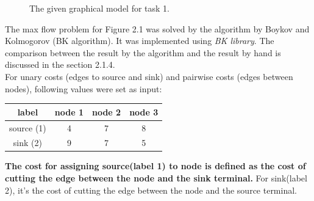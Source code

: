 \documentclass[paper=a4, fontsize=11pt]{scrartcl} %
\numberwithin{equation}{section} %
\numberwithin{figure}{section} %
\numberwithin{table}{section} %
\begin{document}
\begin{figure}[H]
\caption{The given graphical model for task 1.\label{fig:simple}}
\vspace*{5mm}
\centering
{}
\end{figure}

The max flow problem for Figure 2.1 was solved by the algorithm by Boykov and Kolmogorov (BK algorithm). It was implemented using \textit{BK library}. The comparison between the result by the algorithm and the result by hand is discussed in the section 2.1.4.
\\

For unary costs (edges to source and sink) and pairwise costs (edges between nodes), following values were set as input: 

\begin{table}[h]
 \label{tab:title} 
\centering
\begin{tabular}{| c | c | c | c | }
\hline
label		& node 1 	& node 2	& node 3 \\
\hline 
source (1)	& 4 		& 7			& 8 	 \\ 
\hline							
sink (2)	& 9 		& 7			& 5  	 \\ 
\hline							
\end{tabular}
\end{table}

\textbf{The cost for assigning source(label 1) to node is defined as the cost of cutting the edge between the node and the sink terminal.} For sink(label 2), it's the cost of cutting the edge between the node and the source terminal.  
\end{document}
